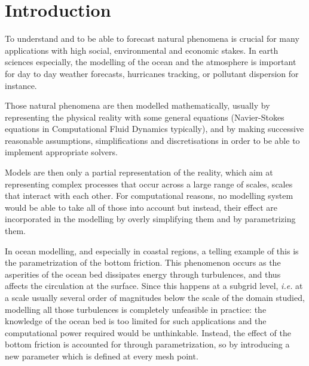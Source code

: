 \documentclass[../../Main_ManuscritThese.tex]{subfiles}
\begin{document}
\pagestyle{introStyle}
\chapter*{Introduction}
\TitleBtwLines
{}
{}
\label{chap:Introduction}
To understand and to be able to forecast natural phenomena is crucial
for many applications with high social, environmental and economic
stakes.  In earth sciences especially, the modelling of the ocean and
the atmosphere is important for day to day weather forecasts,
hurricanes tracking, or pollutant dispersion for instance. %

Those natural phenomena are then modelled mathematically, usually by
representing the physical reality with some general equations
(Navier-Stokes equations in Computational Fluid Dynamics typically),
and by making successive reasonable assumptions, simplifications and
discretisations in order to be able to implement appropriate
solvers.%

Models are then only a partial representation of the reality, which
aim at representing complex processes that occur across a large range
of scales, scales that interact with each other. For computational
reasons, no modelling system would be able to take all of those into
account but instead, their effect are incorporated in the modelling by
overly simplifying them and by {parametrizing} them.

In ocean modelling, and especially in coastal regions, a telling
example of this is the parametrization of the bottom friction. This
phenomenon occurs as the asperities of the ocean bed dissipates energy
through turbulences, and thus affects the circulation at the
surface. Since this happens at a subgrid level, \emph{i.e.} at a scale
usually several order of magnitudes below the scale of the domain
studied, modelling all those turbulences is completely unfeasible in
practice: the knowledge of the ocean bed is too limited for such
applications and the computational power required would be
unthinkable. Instead, the effect of the bottom friction is accounted
for through parametrization, so by introducing a new parameter which
is defined at every mesh point.
\end{document}
